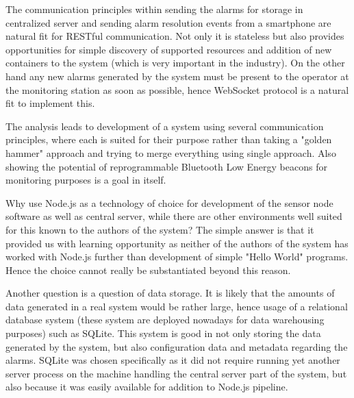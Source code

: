 \bigskip

The communication principles within sending the alarms for storage in centralized server and sending alarm resolution events from a smartphone are natural fit for RESTful communication. Not only it is stateless but also provides opportunities for simple discovery of supported resources and addition of new containers to the system (which is very important in the industry). On the other hand any new alarms generated by the system must be present to the operator at the monitoring station as soon as possible, hence WebSocket protocol is a natural fit to implement this.

\bigskip

The analysis leads to development of a system using several communication principles, where each is suited for their purpose rather than taking a "golden hammer" approach and trying to merge everything using single approach. Also showing the potential of reprogrammable Bluetooth Low Energy beacons for monitoring purposes is a goal in itself.  


\bigskip

Why use Node.js as a technology of choice for development of the sensor node software as well as central server, while there are other environments well suited for this known to the authors of the system? The simple answer is that it provided us with learning opportunity as neither of the authors of the system has worked with Node.js further than development of simple "Hello World" programs. Hence the choice cannot really be substantiated beyond this reason. 

\bigskip

Another question is a question of data storage. It is likely that the amounts of data generated in a real system would be rather large, hence usage of a relational database system (these system are deployed nowadays for data warehousing purposes) such as SQLite. This system is good in not only storing the data generated by the system, but also configuration data and metadata regarding the alarms. SQLite was chosen specifically as it did not require running yet another server process on the machine handling the central server part of the system, but also because it was easily available for addition to Node.js pipeline. 

